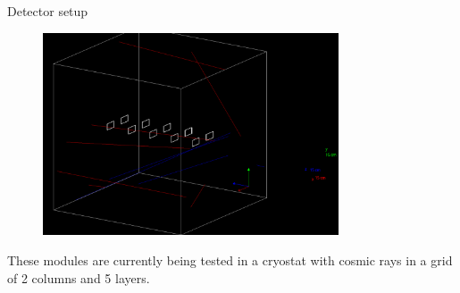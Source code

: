 \documentclass[8pt]{beamer}
\begin{document}
\begin{frame}{Detector setup}
    
    

    \begin{figure}
            \includegraphics[height=6cm]{img/detector.png}
    \end{figure}
    These modules are currently being tested in a cryostat with cosmic rays in a grid of 2 columns and 5 layers.

    
    
    
    
                
\end{frame}
\end{document}
